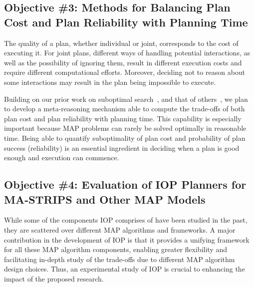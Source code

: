 \documentclass[11pt]{article}
\newcommand{\note}[1]{\textbf{\textit{#1}}}
\begin{document}
 
\subsection{Objective \#3: Methods for Balancing Plan Cost and Plan Reliability with Planning Time}

The quality of a plan, whether individual or joint,  corresponds to the cost of executing it. For joint plans, different ways of handling potential interactions, as well as the possibility of ignoring them, result in different execution costs and require different computational efforts. Moreover, deciding not to reason about some interactions may result in the plan being impossible to execute. 

Building on our prior work on suboptimal search~\cite{barer2014suboptimal-socs,stern2014potential,stern2011probably,stern2012search}, and that of others~\cite{pohl1973avoidance,pearl1982studies,thayer2011bounded}, we plan to develop a meta-reasoning mechanism able to compute the trade-offs of both plan cost and plan reliability with planning time. This capability is especially important because MAP problems can rarely be solved optimally in reasonable time.  Being able to quantify suboptimality of plan cost and probability of plan success (reliability) is an essential ingredient in deciding when a plan is good enough and execution can commence.

\subsection{Objective \#4: Evaluation of IOP Planners for MA-STRIPS and Other MAP Models}

While some of the components IOP comprises of have been studied in the past, they are scattered over different MAP algorithms and frameworks. A major contribution in the development of IOP is that it provides a unifying framework for all these MAP algorithm components, enabling greater flexibility and facilitating in-depth study of the trade-offs due to different MAP algorithm design choices. Thus, an experimental study of IOP is crucial to enhancing the impact of the proposed research.
\end{document}
